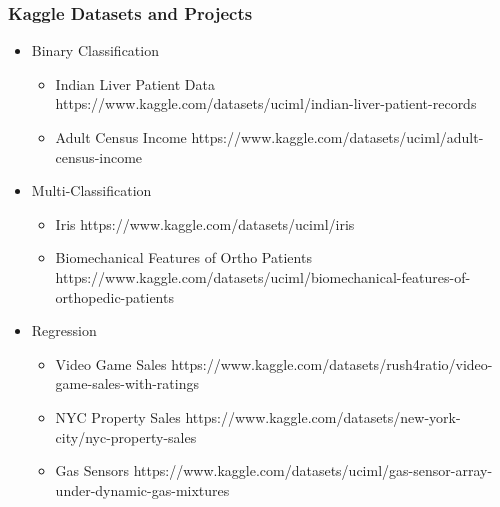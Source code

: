 \begin{frame}\frametitle{Kaggle Datasets and Projects}
\footnotesize
\begin{itemize}
\item Binary Classification
\begin{itemize}
\item Indian Liver Patient Data https://www.kaggle.com/datasets/uciml/indian-liver-patient-records
\item Adult Census Income https://www.kaggle.com/datasets/uciml/adult-census-income
\end{itemize}

\item Multi-Classification
\begin{itemize}
\item Iris https://www.kaggle.com/datasets/uciml/iris
\item Biomechanical Features of Ortho Patients https://www.kaggle.com/datasets/uciml/biomechanical-features-of-orthopedic-patients
\end{itemize}
\item Regression
\begin{itemize}
\item Video Game Sales https://www.kaggle.com/datasets/rush4ratio/video-game-sales-with-ratings
\item NYC Property Sales https://www.kaggle.com/datasets/new-york-city/nyc-property-sales
\item Gas Sensors https://www.kaggle.com/datasets/uciml/gas-sensor-array-under-dynamic-gas-mixtures
\end{itemize}
\end{itemize}
\end{frame}


